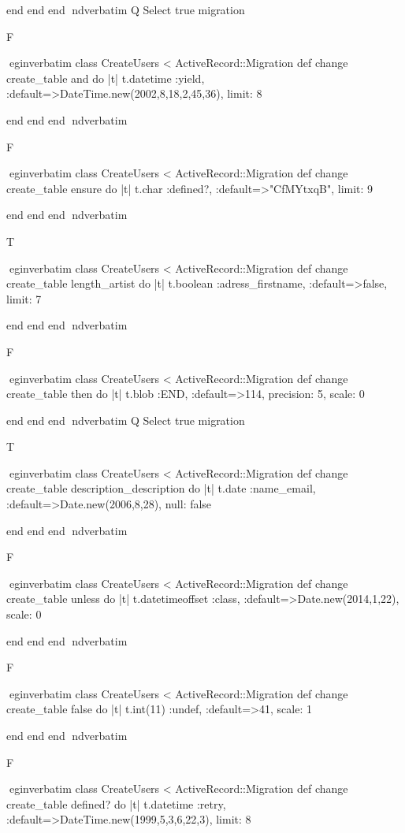     end 
  end 
end
nd{verbatim}
Q
 Select true migration

F

egin{verbatim}
 class CreateUsers < ActiveRecord::Migration 
  def change 
    create_table and do |t| 
      t.datetime :yield, :default=>DateTime.new(2002,8,18,2,45,36), limit: 8
    
    end 
  end 
end
nd{verbatim}

F

egin{verbatim}
 class CreateUsers < ActiveRecord::Migration 
  def change 
    create_table ensure do |t| 
      t.char :defined?, :default=>"CfMYtxqB", limit: 9
    
    end 
  end 
end
nd{verbatim}

T

egin{verbatim}
 class CreateUsers < ActiveRecord::Migration 
  def change 
    create_table length_artist do |t| 
      t.boolean :adress_firstname, :default=>false, limit: 7
    
    end 
  end 
end
nd{verbatim}

F

egin{verbatim}
 class CreateUsers < ActiveRecord::Migration 
  def change 
    create_table then do |t| 
      t.blob :END, :default=>114, precision: 5, scale: 0
    
    end 
  end 
end
nd{verbatim}
Q
 Select true migration

T

egin{verbatim}
 class CreateUsers < ActiveRecord::Migration 
  def change 
    create_table description_description do |t| 
      t.date :name_email, :default=>Date.new(2006,8,28), null: false
    
    end 
  end 
end
nd{verbatim}

F

egin{verbatim}
 class CreateUsers < ActiveRecord::Migration 
  def change 
    create_table unless do |t| 
      t.datetimeoffset :class, :default=>Date.new(2014,1,22), scale: 0
    
    end 
  end 
end
nd{verbatim}

F

egin{verbatim}
 class CreateUsers < ActiveRecord::Migration 
  def change 
    create_table false do |t| 
      t.int(11) :undef, :default=>41, scale: 1
    
    end 
  end 
end
nd{verbatim}

F

egin{verbatim}
 class CreateUsers < ActiveRecord::Migration 
  def change 
    create_table defined? do |t| 
      t.datetime :retry, :default=>DateTime.new(1999,5,3,6,22,3), limit: 8
    
